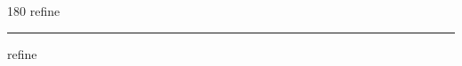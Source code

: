
\begin{frame}
\begin{center}
\begin{turn}{180}
{\fontsize{2.5cm}{1em}\selectfont refine}
\end{turn}
\vspace{1em}\par  
\hrule
\vspace{1em}\par  
{\fontsize{2.5cm}{1em}\selectfont refine}
\end{center}
\end{frame}
